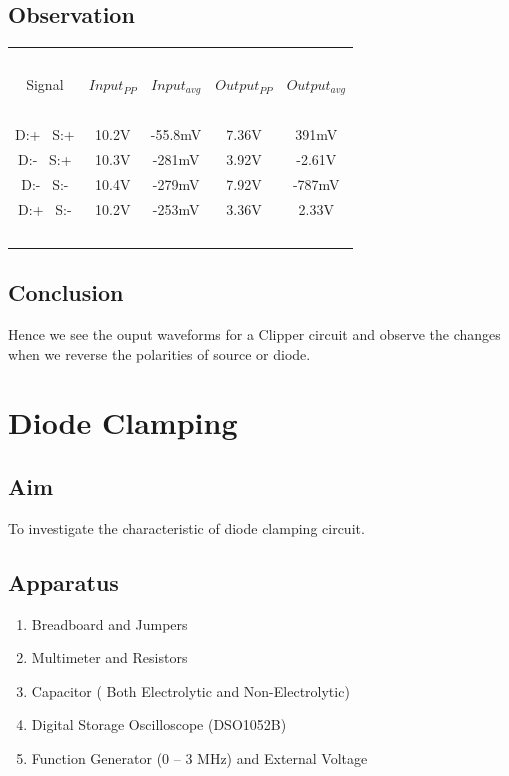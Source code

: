 \documentclass{article}
\begin{document}
\subsection{Observation}
\vspace{5px}
\begin{center}
\begin{tabular}{| c | c | c | c | c |} 
 \hline
    \ & \ & \ & \ & \ \\
    Signal & $Input_{PP}$ & $Input_{avg}$ & $Output_{PP}$ & $Output_{avg}$ \\ [1em]
    \hline
    \ & \ & \ & \ & \ \\
    D:+ \ S:+  & 10.2V & -55.8mV & 7.36V & 391mV \\
    D:- \ S:+  & 10.3V & -281mV & 3.92V & -2.61V \\
    D:- \ S:-  & 10.4V & -279mV & 7.92V & -787mV \\
    D:+ \ S:-  & 10.2V & -253mV & 3.36V & 2.33V \\
    \ & \ & \ & \ & \ \\
 \hline
\end{tabular}
\end{center}

\subsection{Conclusion}
Hence we see the ouput waveforms for a Clipper circuit and observe the changes when we reverse the polarities of source or diode.



\newpage

\section{Diode Clamping}
\subsection{Aim}
To investigate the characteristic of diode clamping circuit.
\subsection{Apparatus}
\begin{enumerate}
\item Breadboard and Jumpers
\item Multimeter and Resistors
\item Capacitor ( Both Electrolytic and Non-Electrolytic)
\item Digital Storage Oscilloscope (DSO1052B)
\item Function Generator (0 – 3 MHz) and External Voltage
\end{enumerate}
\end{document}
